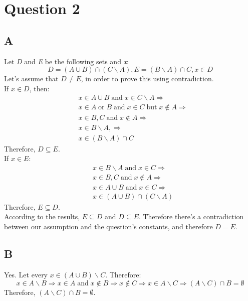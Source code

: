 \documentclass[12pt, oneside]{article}
\begin{document}
\section{Question 2}
\subsection{A}
Let \emph{D} and \emph{E} be the following sets and \emph{x}:
\begin{equation*}
D = (A \cup B) \cap (C \backslash A), E = (B \backslash A) \cap C, x \in D
\end{equation*}
Let's assume that $D \neq E$, in order to prove this using contradiction.\\
If $x \in D$, then:
\begin{equation*}
\begin{split}
& x \in A \cup B\;\text{and}\;x \in C \backslash A \Rightarrow \\
& x \in A\;\text{or}\;B\;\text{and}\;x \in C\;\text{but}\;x \not\in A \Rightarrow \\
& x \in B, C\;\text{and}\; x \not\in A\Rightarrow \\
& x \in B \backslash A, \Rightarrow \\
& x \in (B \backslash A) \cap C
\end{split}
\end{equation*}
Therefore, $D \subseteq E$.\\
If $x \in E$:
\begin{equation*}
\begin{split}
& x \in B \backslash A\;\text{and}\;x \in C \Rightarrow \\
& x \in B, C\;\text{and}\;x \not\in A \Rightarrow \\
& x \in A \cup B\;\text{and}\;x \in C \Rightarrow \\
& x \in (A \cup B) \cap (C \backslash A)
\end{split}
\end{equation*}
Therefore, $E \subseteq D$.\\
According to the results, $E \subseteq D$ and $D \subseteq E$. Therefore there's a contradiction between our assumption and the question's constants, and therefore $D = E$.

\subsection{B}
Yes. Let every $x \in (A \cup B) \backslash C$. Therefore:
\begin{equation*}
x \in A \backslash B \Rightarrow
x \in A\;\text{and}\;x \not\in B \Rightarrow
x \not\in C \Rightarrow
x \in A \backslash C \Rightarrow
(A \backslash C) \cap B = \emptyset
\end{equation*}
Therefore, $(A \backslash C) \cap B = \emptyset$.
\end{document}
